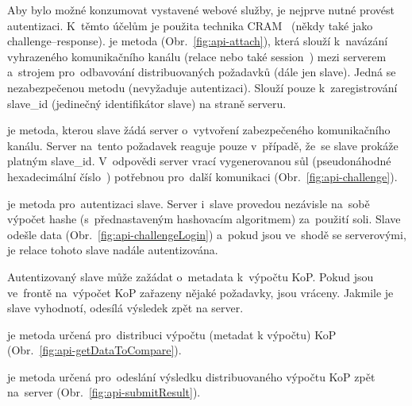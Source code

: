 
Aby bylo možné konzumovat vystavené webové služby, je nejprve nutné provést autentizaci. K~těmto účelům je použita technika CRAM~\cite{challenge-response} (někdy také jako challenge--response).
je metoda (Obr.~\ref{fig:api-attach}), která slouží k~navázání vyhrazeného komunikačního kanálu (relace nebo také session~\cite{session}) mezi serverem a~strojem pro~odbavování distribuovaných požadavků (dále jen slave). Jedná se nezabezpečenou metodu (nevyžaduje autentizaci). Slouží pouze k~zaregistrování slave\_id (jedinečný identifikátor slave) na straně serveru.


je metoda, kterou slave žádá server o~vytvoření zabezpečeného komunikačního kanálu. Server na~tento požadavek reaguje pouze v~případě, že~se slave prokáže platným slave\_id. V~odpovědi server vrací vygenerovanou sůl (pseudonáhodné hexadecimální číslo~\cite{hash}) potřebnou pro~další komunikaci (Obr.~\ref{fig:api-challenge}).


 je metoda pro~autentizaci slave. Server i~slave provedou nezávisle na~sobě výpočet hashe (s~přednastaveným hashovacím algoritmem) za~použití soli. Slave odešle data (Obr.~\ref{fig:api-challengeLogin}) a~pokud jsou ve~shodě se serverovými, je relace tohoto slave nadále autentizována.


Autentizovaný slave může zažádat o~metadata k~výpočtu KoP. Pokud jsou ve~frontě na~výpočet KoP zařazeny nějaké požadavky, jsou vráceny. Jakmile je slave vyhodnotí, odesílá výsledek zpět na server.

je metoda určená pro~distribuci výpočtu (metadat k výpočtu) KoP (Obr.~\ref{fig:api-getDataToCompare}).


je metoda určená pro~odeslání výsledku distribuovaného výpočtu KoP zpět na~server (Obr.~\ref{fig:api-submitResult}).

